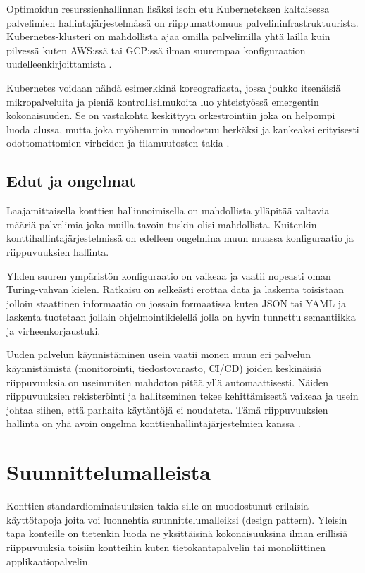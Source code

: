 \documentclass[finnish]{tktltiki2}
\theoremstyle{definition}
\theoremstyle{remark}
\begin{document}
Optimoidun resurssienhallinnan lisäksi isoin etu Kuberneteksen kaltaisessa palvelimien hallintajärjestelmässä on riippumattomuus palvelininfrastruktuurista. Kubernetes-klusteri on mahdollista ajaa omilla palvelimilla yhtä lailla kuin pilvessä kuten AWS:ssä tai GCP:ssä ilman suurempaa konfiguraation uudelleenkirjoittamista \cite{kubernetes-rule-world}.

Kubernetes voidaan nähdä esimerkkinä koreografiasta, jossa joukko itsenäisiä mikropalveluita ja pieniä kontrollisilmukoita luo yhteistyössä emergentin kokonaisuuden. Se on vastakohta keskittyyn orkestrointiin joka on helpompi luoda alussa, mutta joka myöhemmin muodostuu herkäksi ja kankeaksi erityisesti odottomattomien virheiden ja tilamuutosten takia \cite{borg-omega-kubernetes}.

\subsection{Edut ja ongelmat}

Laajamittaisella konttien hallinnoimisella on mahdollista ylläpitää valtavia määriä palvelimia joka muilla tavoin tuskin olisi mahdollista. Kuitenkin konttihallintajärjestelmissä on edelleen ongelmina muun muassa konfiguraatio ja riippuvuuksien hallinta.

Yhden suuren ympäristön konfiguraatio on vaikeaa ja vaatii nopeasti oman Turing-vahvan kielen. Ratkaisu on selkeästi erottaa data ja laskenta toisistaan jolloin staattinen informaatio on jossain formaatissa kuten JSON tai YAML ja laskenta tuotetaan jollain ohjelmointikielellä jolla on hyvin tunnettu semantiikka ja virheenkorjaustuki.

Uuden palvelun käynnistäminen usein vaatii monen muun eri palvelun käynnistämistä (monitorointi, tiedostovarasto, CI/CD) joiden keskinäisiä riippuvuuksia on useimmiten mahdoton pitää yllä automaattisesti. Näiden riippuvuuksien rekisteröinti ja hallitseminen tekee kehittämisestä vaikeaa ja usein johtaa siihen, että parhaita käytäntöjä ei noudateta. Tämä riippuvuuksien hallinta on yhä avoin ongelma konttienhallintajärjestelmien kanssa \cite{borg-omega-kubernetes}.

\section{Suunnittelumalleista}

Konttien standardiominaisuuksien takia sille on muodostunut erilaisia käyttötapoja joita voi luonnehtia suunnittelumalleiksi (design pattern). Yleisin tapa konteille on tietenkin luoda ne yksittäisinä kokonaisuuksina ilman erillisiä riippuvuuksia toisiin kontteihin kuten tietokantapalvelin tai monoliittinen applikaatiopalvelin.
\end{document}
